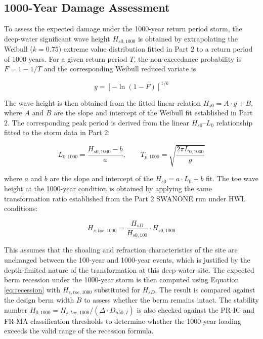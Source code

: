 \documentclass[a4paper, 11pt]{article}
\begin{document}
\subsection{1000-Year Damage Assessment}
\hspace{0.5cm}To assess the expected damage under the 1000-year return period storm, the deep-water significant wave height $H_{s0,1000}$ is obtained by extrapolating the Weibull ($k = 0.75$) extreme value distribution fitted in Part 2 to a return period of 1000 years. For a given return period $T$, the non-exceedance probability is $F = 1 - 1/T$ and the corresponding Weibull reduced variate is

\begin{equation}
    y = \left[-\ln\left(1 - F\right)\right]^{1/k}
    \label{eq:weibull_y}
\end{equation}

The wave height is then obtained from the fitted linear relation $H_{s0} = A \cdot y + B$, where $A$ and $B$ are the slope and intercept of the Weibull fit established in Part 2. The corresponding peak period is derived from the linear $H_{s0}$--$L_0$ relationship fitted to the storm data in Part 2:

\begin{equation}
    L_{0,1000} = \frac{H_{s0,1000} - b}{a}, \qquad T_{p,1000} = \sqrt{\frac{2\pi L_{0,1000}}{g}}
    \label{eq:Tp1000}
\end{equation}

where $a$ and $b$ are the slope and intercept of the $H_{s0} = a \cdot L_0 + b$ fit. The toe wave height at the 1000-year condition is obtained by applying the same transformation ratio established from the Part 2 SWANONE run under HWL conditions:

\begin{equation}
    H_{s,toe,1000} = \frac{H_{sD}}{H_{s0,100}} \cdot H_{s0,1000}
    \label{eq:Hstoe1000}
\end{equation}

This assumes that the shoaling and refraction characteristics of the site are unchanged between the 100-year and 1000-year events, which is justified by the depth-limited nature of the transformation at this deep-water site. The expected berm recession under the 1000-year storm is then computed using Equation \ref{eq:recession} with $H_{s,toe,1000}$ substituted for $H_{sD}$. The result is compared against the design berm width $B$ to assess whether the berm remains intact. The stability number $H_{0,1000} = H_{s,toe,1000}/(\Delta \cdot D_{n50,I})$ is also checked against the PR-IC and FR-MA classification thresholds to determine whether the 1000-year loading exceeds the valid range of the recession formula.
\end{document}
